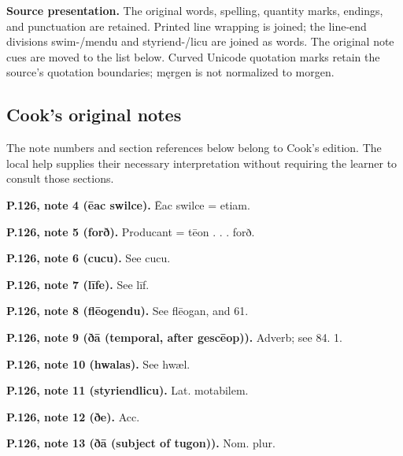 \textbf{Source presentation.} The original words, spelling, quantity marks, endings, and punctuation are retained. Printed line wrapping is joined; the line-end divisions swim-/\allowbreak{}mendu and styriend-/\allowbreak{}licu are joined as words. The original note cues are moved to the list below. Curved Unicode quotation marks retain the source’s quotation boundaries; męrgen is not normalized to morgen.

\subsection*{Cook’s original notes}

The note numbers and section references below belong to Cook’s edition. The local help supplies their necessary interpretation without requiring the learner to consult those sections.

\textbf{P.126, note 4 (ēac swilce).} Ēac swilce = etiam.

\textbf{P.126, note 5 (forð).} Producant = tēon . . . forð.

\textbf{P.126, note 6 (cucu).} See cucu.

\textbf{P.126, note 7 (līfe).} See līf.

\textbf{P.126, note 8 (flēogendu).} See flēogan, and 61.

\textbf{P.126, note 9 (ðā (temporal, after gescēop)).} Adverb; see 84. 1.

\textbf{P.126, note 10 (hwalas).} See hwæl.

\textbf{P.126, note 11 (styriendlicu).} Lat. motabilem.

\textbf{P.126, note 12 (ðe).} Acc.

\textbf{P.126, note 13 (ðā (subject of tugon)).} Nom. plur.

